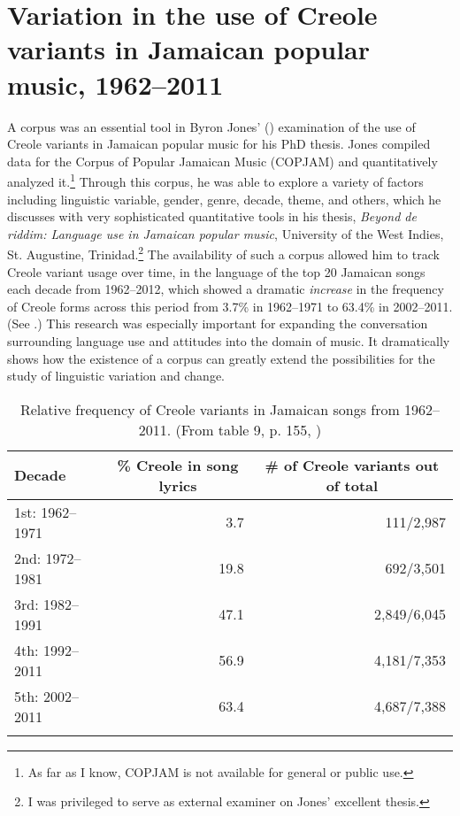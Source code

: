 \documentclass[output=paper,colorlinks,citecolor=brown]{langscibook}
\begin{document}
\section{Variation in the use of Creole variants in {Jamaican} popular music, 1962--2011}

A corpus was an essential tool in Byron Jones' (\citeyear{Jones2019}) examination of the use of Creole variants in Jamaican popular music for his PhD thesis. Jones compiled data for the Corpus of Popular Jamaican Music (COPJAM) and quantitatively analyzed it.\footnote{As far as I know, COPJAM is not available for general or public use.} Through this corpus, he was able to explore a variety of factors including linguistic variable, gender, genre, decade, theme, and others, which he discusses with very sophisticated quantitative tools in his thesis, \textit{Beyond de riddim: Language use in Jamaican popular music}, University of the West Indies, St. Augustine, Trinidad.\footnote{I was privileged to serve as external examiner on Jones’ excellent thesis.} The availability of such a corpus allowed him to track Creole variant usage over time, in the language of the top 20 Jamaican songs each decade from 1962--2012, which showed a dramatic \textit{increase} in the frequency of Creole forms across this period from 3.7\% in 1962--1971 to 63.4\% in 2002--2011. (See .) This research was especially important for expanding the conversation surrounding language use and attitudes into the domain of music.  It dramatically shows how the existence of a corpus can greatly extend the possibilities for the study of linguistic variation and change.

\begin{table}
\begin{tabular}{lrr}
\lsptoprule
Decade & \multicolumn{1}{c}{\% Creole in song lyrics} & \multicolumn{1}{c}{\# of Creole variants out of total}\\\midrule
1st: 1962--1971 & 3.7  &  111/2,987\\
2nd: 1972--1981 & 19.8 &  692/3,501\\
3rd: 1982--1991 & 47.1 & 2,849/6,045\\
4th: 1992--2011 & 56.9 & 4,181/7,353\\
5th: 2002--2011 & 63.4 & 4,687/7,388\\
\lspbottomrule
\end{tabular}
\caption{Relative frequency of Creole variants in Jamaican songs from 1962--2011.  (From table 9, p. 155, \citealt{Jones2019})\label{tab:1 rickford:1}}
\end{table}
\end{document}
